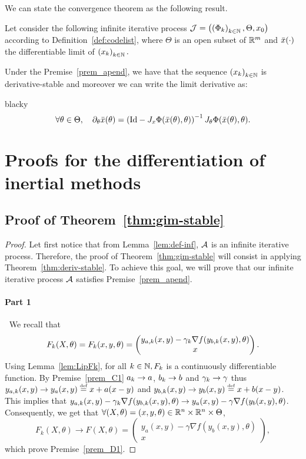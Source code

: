 \begin{appendices}
 We can state the convergence theorem as  the following result.
 
\begin{theorem}\label{thm:deriv-stable} Let consider the following infinite iterative process $\mathcal{J}=\left({\left(\Phi_k\right)_{k\in\mathbb{N}},\Theta,x_{0}}\right)$ according to Definition~\ref{def:codelist},  where $\Theta$ is an open subset of  $\mathbb{R}^m$ and $\bar{x}(\cdot)$ the differentiable limit of $\left(x_{k}\right)_{k\in\mathbb{N}}.$ 

Under the Premise~\ref{prem_apend}, we have that the sequence $\left(x_{k}\right)_{k\in\mathbb{N}}$ is derivative-stable and moreover we can write the limit derivative as: 
\begin{centerbox}{black}{}y
\begin{equation}\label{eq:deriv-limit}
\forall \theta\in\Theta, \quad \partial_{\theta}\bar{x}(\theta)=\left({\mathrm{Id}-J_x\Phi(\bar{x}(\theta),\theta)}\right)^{-1}J_{\theta}\Phi(\bar{x}(\theta),\theta).
\end{equation}
\end{centerbox}
\end{theorem}

\section{Proofs for the differentiation of inertial methods }\label{prf:ad-ima}

\subsection{Proof of Theorem~\ref{thm:gim-stable}}\label{prf:thm:gim-stable}
\begin{proof}
Let first notice that from Lemma~\ref{lem:def-inf},  $\mathcal{A}$ is an infinite iterative process. Therefore, the proof of Theorem~\ref{thm:gim-stable} will consist in applying Theorem~\ref{thm:deriv-stable}. To achieve this goal, we will prove that our infinite iterative process $\mathcal{A}$  satisfies Premise~\ref{prem_apend}. 
\paragraph{Part 1} \label{thm:gim-stable-part1}$~$  We recall that
\[
	F_k(X,\theta)= F_k(x,y,\theta)=\begin{pmatrix}
y_{a,k}(x,y)-\gamma_{k}\nabla f(y_{b,k}(x,y),\theta)\\
x
\end{pmatrix}.
\]
Using Lemma~\ref{lem:LipFk}, for all $k\in\mathbb{N}, F_k$ is a continuously differentiable function. By  Premise~\ref{prem_C1}  $a_{k}\to a$, $b_{k}\to b$ and $\gamma_{k} \to \gamma$ thus $y_{a,k}(x,y)\to y_{a}(x,y)\stackrel{\text{\rm\tiny def}}{=} x+a(x-y)$  and $y_{b,k}(x,y)\to y_{b}(x,y)\stackrel{\text{\rm\tiny def}}{=} x+b(x-y)$. This implies that $y_{a,k}(x,y)-\gamma_{k}\nabla f(y_{b,k}(x,y),\theta)\to y_a(x,y)-\gamma\nabla f(y_b(x,y),\theta)$. Consequently, we get that $\forall (X,\theta)=(x,y,\theta)\in\mathbb{R}^{n}\times\mathbb{R}^{n}\times\Theta$,
\[
F_k(X,\theta)\to F(X,\theta)= \begin{pmatrix}
y_a(x,y)-\gamma\nabla f(y_b(x,y),\theta)\\
x
\end{pmatrix},
\]
which prove Premise~\ref{prem_D1}.

\end{proof}
\end{appendices}
